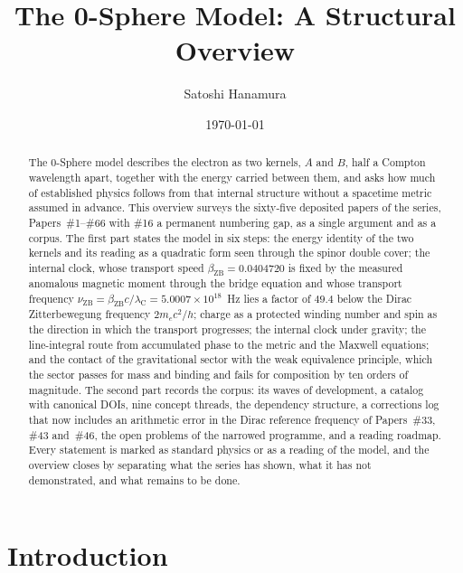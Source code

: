 \documentclass[%
 reprint, amsmath,amssymb, aps, prb, ]{revtex4-2}
\numberwithin{equation}{section}
\newcommand{\betaZB}{\beta_{\text{ZB}}}
\newcommand{\lambdaC}{\lambda_{\text{C}}}
\newcommand{\nuZB}{\nu_{\text{ZB}}}
\begin{document}
\title{The 0-Sphere Model: A Structural Overview}

\author{Satoshi Hanamura}
\date{\today}

\begin{abstract}
The 0-Sphere model describes the electron as two kernels, $A$ and $B$, half a Compton wavelength apart, together with the energy carried between them, and asks how much of established physics follows from that internal structure without a spacetime metric assumed in advance.
This overview surveys the sixty-five deposited papers of the series, Papers~\#1--\#66 with \#16 a permanent numbering gap, as a single argument and as a corpus.
The first part states the model in six steps: the energy identity of the two kernels and its reading as a quadratic form seen through the spinor double cover; the internal clock, whose transport speed $\betaZB = 0.0404720$ is fixed by the measured anomalous magnetic moment through the bridge equation and whose transport frequency $\nuZB = \betaZB c/\lambdaC = 5.0007\times10^{18}$~Hz lies a factor of $49.4$ below the Dirac Zitterbewegung frequency $2m_ec^{2}/h$; charge as a protected winding number and spin as the direction in which the transport progresses; the internal clock under gravity; the line-integral route from accumulated phase to the metric and the Maxwell equations; and the contact of the gravitational sector with the weak equivalence principle, which the sector passes for mass and binding and fails for composition by ten orders of magnitude.
The second part records the corpus: its waves of development, a catalog with canonical DOIs, nine concept threads, the dependency structure, a corrections log that now includes an arithmetic error in the Dirac reference frequency of Papers~\#33, \#43 and~\#46, the open problems of the narrowed programme, and a reading roadmap.
Every statement is marked as standard physics or as a reading of the model, and the overview closes by separating what the series has shown, what it has not demonstrated, and what remains to be done.
\end{abstract}

\maketitle

\section{Introduction}
\label{sec:intro}
\end{document}
